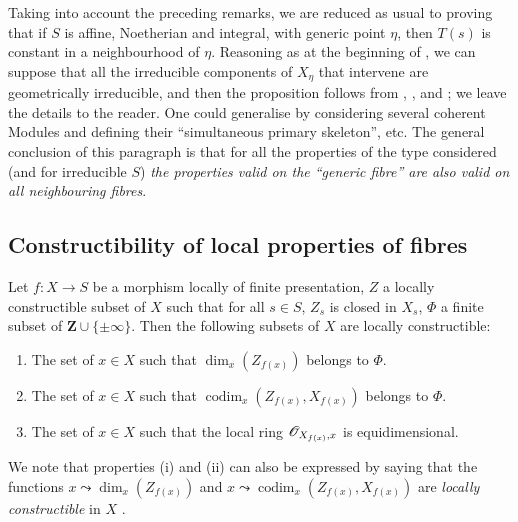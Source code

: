 \begin{remark}[9.8.9]
\medskip
Taking into account the preceding remarks, we are reduced as usual to proving that if $S$ is affine, Noetherian and integral, with generic point $\eta$, then $T(s)$ is constant in a neighbourhood of $\eta$.
Reasoning as at the beginning of , we can suppose that all the irreducible components of $X_\eta$ that intervene are geometrically irreducible, and then the proposition follows from , ,  and ; we leave the details to the reader.
One could generalise by considering several coherent Modules and defining their ``simultaneous primary skeleton'', etc.
The general conclusion of this paragraph is that for all the properties of the type considered (and for irreducible $S$) \emph{the properties valid on the ``generic fibre'' are also valid on all neighbouring fibres}.
\end{remark}

\subsection{Constructibility of local properties of fibres}
\label{subsection:IV.9.9}
\label{IV.9.9}

\begin{proposition}[9.9.1]
\label{IV.9.9.1}
Let $f:X\to S$ be a morphism locally of finite presentation, $Z$ a locally constructible subset of $X$ such that for all $s\in S$, $Z_s$ is closed in $X_s$, $\Phi$ a finite subset of $\mathbf{Z}\cup\{\pm\infty\}$.
Then the following subsets of $X$ are locally constructible:
\begin{enumerate}[label=\textup{(\roman*)}]
  \item The set of $x\in X$ such that $\dim_x(Z_{f(x)})$ belongs to $\Phi$.
  \item The set of $x\in X$ such that $\operatorname{codim}_x(Z_{f(x)},X_{f(x)})$ belongs to $\Phi$.
  \item The set of $x\in X$ such that the local ring $\mathscr{O}_{X_{f(x)},x}$ is equidimensional.
\end{enumerate}
\end{proposition}

We note that properties (i) and (ii) can also be expressed by saying that the functions $x\leadsto\dim_x(Z_{f(x)})$ and $x\leadsto\operatorname{codim}_x(Z_{f(x)},X_{f(x)})$ are \emph{locally constructible} in $X$ .

